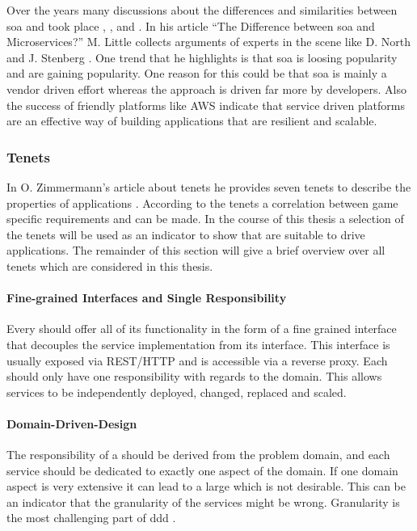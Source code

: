 Over the years many discussions about the differences and similarities between
\gls{soa} and \mss{} took place \cite{little2017soaVSms},
\cite{ogradly2017soaVSms}, and \cite{little2015soaVSms}. In his article ``The
Difference between \gls{soa} and Microservices?'' M. Little collects arguments
of experts in the \ms{} scene like D. North \cite{north2015mss} and J. Stenberg
\cite{stenberg2014mss}. One trend that he highlights is that \gls{soa} is
loosing popularity and \mss{} are gaining popularity. One reason for this could
be that \gls{soa} is mainly a vendor driven effort whereas the \ms{} approach is
driven far more by developers. Also the success of \ms{} friendly platforms like
AWS indicate that service driven platforms are an effective way of building
applications that are resilient and scalable.

\subsubsection{\msuc{} Tenets}

In O. Zimmermann's article about \ms{} tenets he provides seven \ms{} tenets to
describe the properties of \ms{} applications
\cite{zimmermann2016microservices}. According to the tenets a correlation
between game specific requirements and \ogs{} can be made. In the course of this
thesis a selection of the \ms{} tenets will be used as an indicator to show that
\mss{} are suitable to drive \og{} applications. The remainder of this section
will give a brief overview over all \ms{} tenets which are considered in this
thesis.

\paragraph{Fine-grained Interfaces and Single Responsibility}

Every \ms{} should offer all of its functionality in the form of a fine grained
interface that decouples the service implementation from its interface. This
interface is usually exposed via REST/HTTP and is accessible via a reverse
proxy. Each \ms{} should only have one responsibility with regards to the
domain. This allows services to be independently deployed, changed, replaced and
scaled.

\paragraph{Domain-Driven-Design}

The responsibility of a \ms{} should be derived from the problem domain, and
each service should be dedicated to exactly one aspect of the domain. If one
domain aspect is very extensive it can lead to a large \ms{} which is not
desirable. This can be an indicator that the granularity of the services might
be wrong. Granularity is the most challenging part of \gls{ddd}
\cite{millett2015patterns}.

